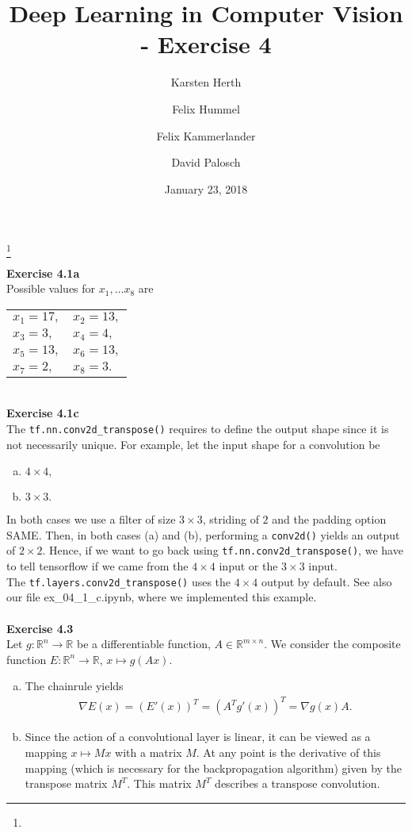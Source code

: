\documentclass[a4paper, reqno]{amsart}
\newcommand{\R}{\mathbb R}
\theoremstyle{definition}
\numberwithin{equation}{section}
\begin{document}
\title[Exercise 4]
{Deep Learning in Computer Vision - Exercise 4}
\author{Karsten Herth}
\author{Felix Hummel}
\author{Felix Kammerlander}
\author{David Palosch}
\thanks{}
\date{January 23, 2018}

\maketitle

{\bf Exercise 4.1a} \\
Possible values for $x_1, \ldots x_8$  are 
\begin{center}
\begin{tabular}{ll}
$x_1 = 17,$ & $x_2 = 13,$ \\
$x_3 = 3,$ & $x_4 = 4,$ \\
$x_5 = 13,$ & $x_6 = 13,$ \\
$x_7 = 2,$ & $x_8 = 3.$
\end{tabular}
\end{center} ~\\

{\bf Exercise 4.1c} \\	The \texttt{tf.nn.conv2d_transpose()} requires to define the output shape since it is not necessarily unique. For example, let the input shape for a convolution be
	\begin{enumerate}
	[(a)]
		\item $4 \times 4,$
		\item $3 \times 3.$
	\end{enumerate}
	In both cases we use a filter of size $3 \times 3$, striding of $2$ and the padding option SAME. Then, in both cases (a) and (b), performing a \texttt{conv2d()} yields
	an output of $2 \times 2.$ Hence, if we want to go back using \texttt{tf.nn.conv2d_transpose()}, we have to tell tensorflow if we came from the $4 \times 4$ input or the
	$3 \times 3$ input. \\
	The \texttt{tf.layers.conv2d_transpose()} uses the $4 \times 4$ output by default. See also our file ex_04_1_c.ipynb, where we implemented this example. \\ \\

{\bf Exercise 4.3} \\
Let $g:\R^n \to \R$ be a differentiable function, $A\in \R^{m\times n}$. We consider the composite function $E:\R^n \to \R$, $x\mapsto g(Ax)$.
\begin{enumerate}[(a)]
\item The chainrule yields
\begin{align*}
\nabla E(x) = (E'(x))^T = (A^T g'(x))^T = \nabla g(x) A.
\end{align*}
\item Since the action of a convolutional layer is linear, it can be viewed as a mapping $x\mapsto Mx$ with a matrix $M$. At any point is the derivative of this mapping (which is necessary for the backpropagation algorithm) given by the transpose matrix $M^T$. This matrix $M^T$ describes a transpose convolution. 
\end{enumerate}
\end{document}

